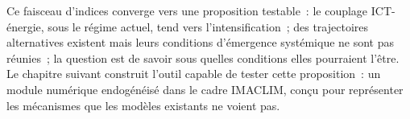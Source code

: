 Ce faisceau d'indices converge vers une proposition testable~: le couplage ICT-\'energie, sous le r\'egime actuel, tend vers l'intensification~; des trajectoires alternatives existent mais leurs conditions d'\'emergence syst\'emique ne sont pas r\'eunies~; la question est de savoir sous quelles conditions elles pourraient l'\^etre. Le chapitre suivant construit l'outil capable de tester cette proposition~: un module num\'erique endog\'en\'eis\'e dans le cadre IMACLIM, con\c{c}u pour repr\'esenter les m\'ecanismes que les mod\`eles existants ne voient pas.


%
%
%
%
%
%
